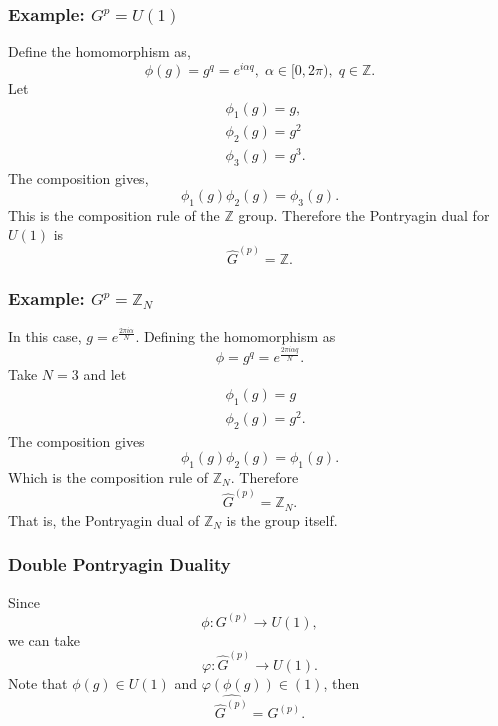 \documentclass{article}
\begin{document}
\subsubsection*{Example: $G^{p}=U(1)$}
Define the homomorphism as,
\begin{equation}
	\phi(g)=g^q=e^{i\alpha q},\; \alpha\in [0,2\pi),\;q\in\mathbb{Z}.
\end{equation}
Let 
\begin{align}
	&\phi_1(g)=g,\\
	&\phi_2(g)=g^2\\
	&\phi_3(g)=g^3.
\end{align}
The composition gives, 
\begin{equation}
	\phi_1(g)\phi_2(g)=\phi_3(g). 
\end{equation}
This is the composition rule of the $\mathbb{Z}$ group. Therefore the Pontryagin dual for $U(1)$ is 
\begin{equation}
	\widehat{G}^{(p)}=\mathbb{Z}.
\end{equation}
\subsubsection*{Example: $G^{p}=\mathbb{Z}_N$}
In this case, $g=e^{\frac{2\pi i\alpha}{N}}$. Defining the homomorphism as 
\begin{equation}
	\phi=g^q=e^{\frac{2\pi i\alpha q}{N}}.
\end{equation}
Take $N=3$ and let 
\begin{align}
	&\phi_1(g)=g\\
	&\phi_2(g)=g^2. 
\end{align}
The composition gives 
\begin{equation}
	\phi_1(g)\phi_2(g)=\phi_1(g).
\end{equation}
Which is the composition rule of $\mathbb{Z}_N$. Therefore
\begin{equation}
	\widehat{G}^{(p)}=\mathbb{Z}_N.
\end{equation}
That is, the Pontryagin dual of $\mathbb{Z}_N$ is the group itself. 
\subsubsection*{Double Pontryagin Duality}
Since 
\begin{equation}
	\phi:G^{(p)}\to U(1),
\end{equation}
we can take 
\begin{equation}
	\varphi:\widehat{G}^{(p)}\to U(1). 
\end{equation}
Note that $\phi(g)\in U(1)$ and $\varphi(\phi(g))\in (1)$, then 
\begin{equation}
\widehat{\widehat{G}^{(p)}}=G^{(p)}.
\end{equation}
\end{document}

